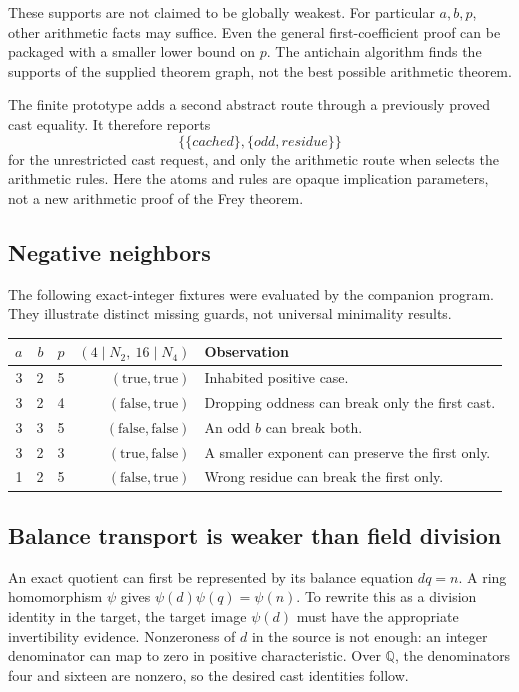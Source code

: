 \documentclass[11pt,a4paper]{article}
\theoremstyle{definition}
\theoremstyle{remark}
\newcommand{\code}[1]{\texttt{\detokenize{#1}}}
\newcommand{\QQ}{\mathbb Q}
\begin{document}
These supports are not claimed to be globally weakest. For particular $a,b,p$,
other arithmetic facts may suffice. Even the general first-coefficient proof
can be packaged with a smaller lower bound on $p$. The antichain algorithm
finds the supports of the supplied theorem graph, not the best possible
arithmetic theorem.

The finite prototype adds a second abstract route through a previously proved
cast equality. It therefore reports
\[
 \{\{\mathit{cached}\},\{\mathit{odd},\mathit{residue}\}\}
\]
for the unrestricted cast request, and only the arithmetic route when
\code{using only} selects the arithmetic rules. Here the atoms and rules are
opaque implication parameters, not a new arithmetic proof of the Frey theorem.

\subsection{Negative neighbors}
The following exact-integer fixtures were evaluated by the companion program.
They illustrate distinct missing guards, not universal minimality results.
\begin{center}\small
\begin{tabular}{@{}rrrrl@{}}
\toprule
$a$ & $b$ & $p$ & $(4\mid N_2,\ 16\mid N_4)$ & Observation\\
\midrule
3&2&5&$(\mathrm{true},\mathrm{true})$& Inhabited positive case.\\
3&2&4&$(\mathrm{false},\mathrm{true})$& Dropping oddness can break only the first cast.\\
3&3&5&$(\mathrm{false},\mathrm{false})$& An odd $b$ can break both.\\
3&2&3&$(\mathrm{true},\mathrm{false})$& A smaller exponent can preserve the first only.\\
1&2&5&$(\mathrm{false},\mathrm{true})$& Wrong residue can break the first only.\\
\bottomrule
\end{tabular}
\end{center}

\subsection{Balance transport is weaker than field division}
An exact quotient can first be represented by its balance equation $dq=n$.
A ring homomorphism $\psi$ gives
$\psi(d)\psi(q)=\psi(n)$. To rewrite this as a division identity in the target,
the target image $\psi(d)$ must have the appropriate invertibility evidence.
Nonzeroness of $d$ in the source is not enough: an integer denominator can map
to zero in positive characteristic. Over $\QQ$, the denominators four and
sixteen are nonzero, so the desired cast identities follow.
\end{document}
